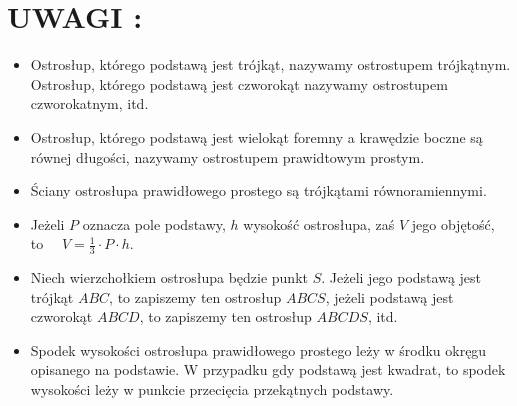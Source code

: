 \documentclass[10pt]{article}
\begin{document}
\section*{UWAGI :}
\begin{itemize}
  \item Ostrosłup, którego podstawą jest trójkąt, nazywamy ostrostupem trójkątnym. Ostrosłup, którego podstawą jest czworokąt nazywamy ostrostupem czworokatnym, itd.
  \item Ostrosłup, którego podstawą jest wielokąt foremny a krawędzie boczne są równej długości, nazywamy ostrostupem prawidtowym prostym.
  \item Ściany ostrosłupa prawidłowego prostego są trójkątami równoramiennymi.
  \item Jeżeli \(P\) oznacza pole podstawy, \(h\) wysokość ostrosłupa, zaś \(V\) jego objętość, to \(\quad V=\frac{1}{3} \cdot P \cdot h\).
  \item Niech wierzchołkiem ostrosłupa będzie punkt \(S\). Jeżeli jego podstawą jest trójkąt \(A B C\), to zapiszemy ten ostrosłup \(A B C S\), jeżeli podstawą jest czworokąt \(A B C D\), to zapiszemy ten ostrosłup \(A B C D S\), itd.
  \item Spodek wysokości ostrosłupa prawidłowego prostego leży w środku okręgu opisanego na podstawie. W przypadku gdy podstawą jest kwadrat, to spodek wysokości leży w punkcie przecięcia przekątnych podstawy.
\end{itemize}
\end{document}
